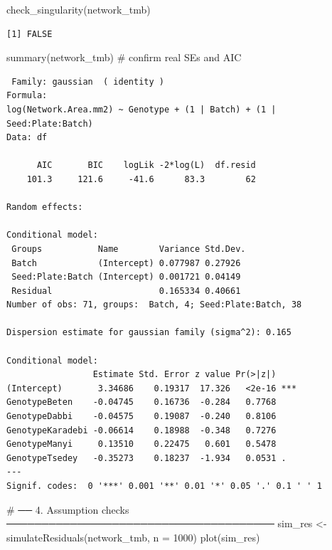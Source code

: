 \documentclass[
  letterpaper,
  DIV=11,
  numbers=noendperiod]{scrartcl}
\newenvironment{Shaded}{\begin{snugshade}}{\end{snugshade}}
\newcommand{\AttributeTok}[1]{\textcolor[rgb]{0.40,0.45,0.13}{#1}}
\newcommand{\CommentTok}[1]{\textcolor[rgb]{0.37,0.37,0.37}{#1}}
\newcommand{\DecValTok}[1]{\textcolor[rgb]{0.68,0.00,0.00}{#1}}
\newcommand{\FunctionTok}[1]{\textcolor[rgb]{0.28,0.35,0.67}{#1}}
\newcommand{\NormalTok}[1]{\textcolor[rgb]{0.00,0.23,0.31}{#1}}
\newcommand{\OtherTok}[1]{\textcolor[rgb]{0.00,0.23,0.31}{#1}}
\begin{document}
\begin{Shaded}
\begin{Highlighting}[]
\FunctionTok{check\_singularity}\NormalTok{(network\_tmb)}
\end{Highlighting}
\end{Shaded}

\begin{verbatim}
[1] FALSE
\end{verbatim}

\begin{Shaded}
\begin{Highlighting}[]
\FunctionTok{summary}\NormalTok{(network\_tmb)   }\CommentTok{\# confirm real SEs and AIC}
\end{Highlighting}
\end{Shaded}

\begin{verbatim}
 Family: gaussian  ( identity )
Formula:          
log(Network.Area.mm2) ~ Genotype + (1 | Batch) + (1 | Seed:Plate:Batch)
Data: df

      AIC       BIC    logLik -2*log(L)  df.resid 
    101.3     121.6     -41.6      83.3        62 

Random effects:

Conditional model:
 Groups           Name        Variance Std.Dev.
 Batch            (Intercept) 0.077987 0.27926 
 Seed:Plate:Batch (Intercept) 0.001721 0.04149 
 Residual                     0.165334 0.40661 
Number of obs: 71, groups:  Batch, 4; Seed:Plate:Batch, 38

Dispersion estimate for gaussian family (sigma^2): 0.165 

Conditional model:
                 Estimate Std. Error z value Pr(>|z|)    
(Intercept)       3.34686    0.19317  17.326   <2e-16 ***
GenotypeBeten    -0.04745    0.16736  -0.284   0.7768    
GenotypeDabbi    -0.04575    0.19087  -0.240   0.8106    
GenotypeKaradebi -0.06614    0.18988  -0.348   0.7276    
GenotypeManyi     0.13510    0.22475   0.601   0.5478    
GenotypeTsedey   -0.35273    0.18237  -1.934   0.0531 .  
---
Signif. codes:  0 '***' 0.001 '**' 0.01 '*' 0.05 '.' 0.1 ' ' 1
\end{verbatim}

\begin{Shaded}
\begin{Highlighting}[]
\CommentTok{\# ── 4. Assumption checks ──────────────────────────────────────}
\NormalTok{sim\_res }\OtherTok{\textless{}{-}} \FunctionTok{simulateResiduals}\NormalTok{(network\_tmb, }\AttributeTok{n =} \DecValTok{1000}\NormalTok{)}
\FunctionTok{plot}\NormalTok{(sim\_res)}
\end{Highlighting}
\end{Shaded}
\end{document}
